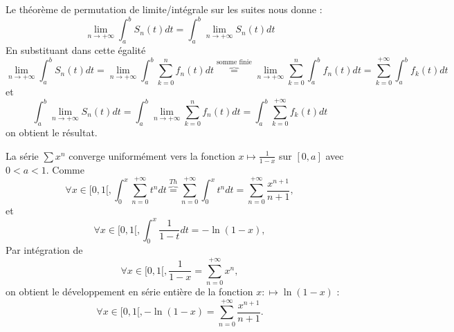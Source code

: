 \documentclass{book}
\begin{document}
\begin{Demonstration}
Le théorème de permutation de limite/intégrale  sur les suites nous donne :
\[ \lim_{n\to +\infty}\int_a^b S_n(t)dt =\int_a^b\lim_{n\to +\infty} S_n(t) dt \]
En substituant dans cette égalité  
$$\lim_{n\to +\infty}\int_a^b S_n(t)dt=\lim_{n\to +\infty}\int_a^b\sum_{k=0}^n f_n(t)dt\overbrace{=}^{\text{somme finie}}\lim_{n\to +\infty}\sum_{k=0}^n \int_a^b f_n(t)dt=\sum _{k=0}^{+\infty } \int_a^b f_k(t)dt$$
et 
$$\int_a^b\lim_{n\to +\infty} S_n(t) dt =\int_a^b\lim_{n\to +\infty} \sum_{k=0}^n f_n(t) dt = \int_a^b \sum _{k=0}^{+\infty } f_k(t)dt$$
on obtient le résultat. 
\end{Demonstration}



\begin{Exemple} La série $\sum x^n$ converge uniformément vers la fonction $x\mapsto \frac{1}{1-x}$ sur $[0,a]$ avec $0<a<1$.  Comme
$$ \forall x \in [0,1[, \int_0^x \sum _{n=0}^{+\infty } t^n dt \overbrace{=}^{Th} \sum _{n=0}^{+\infty } \int_0^x t^n dt = \sum _{n=0}^{+\infty } \frac{x^{n+1}}{n+1},$$
et
$$\forall x \in [0,1[, \int_0^x \frac{1}{1-t} dt = -\ln(1-x),$$
Par intégration de  
$$\forall x \in [0,1[,   \frac{1}{1-x} = \sum _{n=0}^{+\infty } x^n,$$
on obtient le développement en série entière de la fonction $x:\mapsto  \ln(1-x)$ :
$$\forall x \in [0,1[,-\ln(1-x)=  \sum _{n=0}^{+\infty } \frac{x^{n+1}}{n+1}.$$
\end{Exemple}
\end{document}

